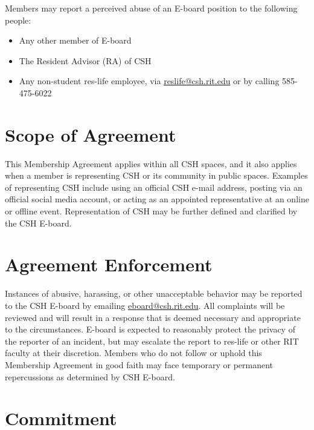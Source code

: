 \documentclass{article}
\begin{document}
\begin{flushleft}
Members may report a perceived abuse of an E-board position to the following
people:
\end{flushleft}

\begin{itemize}
    \item{Any other member of E-board}
    \item{The Resident Advisor (RA) of CSH}
    \item{Any non-student res-life employee, via \href{mailto:reslife@rit.edu}
         {reslife@csh.rit.edu} or by calling 585-475-6022}
\end{itemize}

\section*{Scope of Agreement}

This Membership Agreement applies within all CSH spaces,
and it also applies when a member is representing CSH or its community in
public spaces. Examples of representing CSH include using an official CSH
e-mail address, posting via an official social media account, or acting as
an appointed representative at an online or offline event. Representation
of CSH may be further defined and clarified by the CSH E-board.

\section*{Agreement Enforcement}

Instances of abusive, harassing, or other unacceptable behavior may be
reported to the CSH E-board by emailing \href{mailto:eboard@csh.rit.edu}
{eboard@csh.rit.edu}. All complaints will be reviewed and will result in a
response that is deemed necessary and appropriate to the circumstances.
E-board is expected to reasonably protect the privacy of the reporter of an
incident, but may escalate the report to res-life or other RIT faculty at
their discretion. Members who do not follow or uphold this Membership
Agreement in good faith may face temporary or permanent repercussions as
determined by CSH E-board.

\section*{}
\section*{Commitment}
\end{document}
